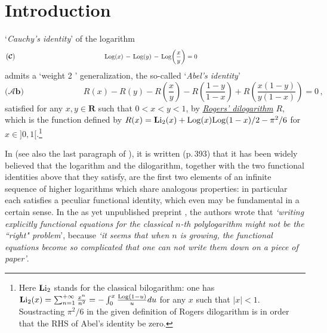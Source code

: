 \documentclass[11pt]{amsart}
\newcommand{\mk}{\medskip}
\begin{document}
\section{\bf Introduction}
\label{S:Intro}
`{\it Cauchy's identity}' of the logarithm 
$$
\boldsymbol{\big(\mathcal C\big)}
\hspace{5cm}
{\rm Log}(x) \, -\, {\rm Log}(y)\, -\, {\rm Log}\bigg(\frac{x}{y}\bigg) = 0
\hspace{6cm} {}^{}
$$
 admits a `weight 2 ' generalization, the so-called `{\it Abel's identity}' 
$$
\boldsymbol{\big(\mathcal Ab\big)}
\hspace{3cm}
{R}(x)-{R}(y)-{R}\left(\frac{x}{y}\right)-{R}\left(\frac{1-y}{1-x}\right)
+{R}\left(\frac{x(1-y)}{y(1-x)}\right)=0\,, 
\hspace{3cm} {}^{}
$$
satisfied for  any $x,y\in \mathbf R$ such that $0<x<y<1$, by \href{https://mathworld.wolfram.com/RogersL-Function.html}{\it Rogers' dilogarithm} $R$, which is the function defined by $R(x)= {\bf L}{\rm i}_2(x) + {\rm Log}(x){\rm Log}(1 - x)/2 - 
{\pi^2}/{6}$ for $x\in ]0,1[$.\footnote{Here ${\bf L}{\rm i}_2$
 stands for the classical bilogarithm: one has ${\bf L}{\rm i}_2(x)=\sum_{n=1}^{+\infty} \frac{x^n}{n^2}=- \int_0^x \frac{{\rm Log}(1-u)}{u} du$ for any $x$ such that $\lvert x\lvert<1$. 
 Soustracting $\pi^2/6$ in the given definition of Rogers dilogarithm is in order that the RHS of Abel's identity be zero.} 
\mk 

 In \cite{HM} (see also the last paragraph of \cite[\S4.1]{Griffiths}),  it is written (p.\,393) that it has been widely believed that the logarithm and the dilogarithm, together with the two functional identities above that they satisfy, are the first two elements of an infinite sequence of higher logarithms which share analogous properties: in particular each satisfies a peculiar functional identity, which even may be fundamental in a certain sense.  
In the as yet unpublished preprint \cite{GoncharovRudenko}, the authors 
wrote that {\it `writing explicitly functional equations for the classical
$n$-th polylogarithm might not be the ``right" problem}', because {\it `it seems that when $n$ is growing, the functional equations become so complicated that one can not write them down on a piece of paper'}.
\end{document}
